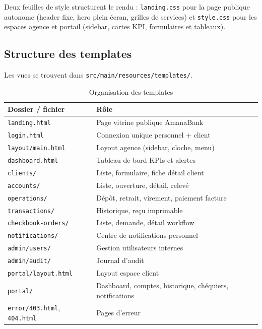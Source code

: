\documentclass[11pt,a4paper,oneside]{report}
\begin{document}
Deux feuilles de style structurent le rendu : \texttt{landing.css} pour la page publique autonome (header fixe, hero plein écran, grilles de services) et \texttt{style.css} pour les espaces agence et portail (sidebar, cartes KPI, formulaires et tableaux).

\subsection{Structure des templates}

Les vues se trouvent dans \texttt{src/main/resources/templates/}.

\begin{table}[H]
    \centering
    \caption{Organisation des templates}
    \label{tab:templates}
    \small
    \begin{tabular}{@{}lp{9cm}@{}}
        \rowcolor{AmanaBrown}
        \color{white}\textbf{Dossier / fichier} & \textbf{Rôle} \\
        \midrule
        \texttt{landing.html} & Page vitrine publique AmanaBank \\
        \texttt{login.html} & Connexion unique personnel + client \\
        \texttt{layout/main.html} & Layout agence (sidebar, cloche, menu) \\
        \texttt{dashboard.html} & Tableau de bord KPIs et alertes \\
        \texttt{clients/} & Liste, formulaire, fiche détail client \\
        \texttt{accounts/} & Liste, ouverture, détail, relevé \\
        \texttt{operations/} & Dépôt, retrait, virement, paiement facture \\
        \texttt{transactions/} & Historique, reçu imprimable \\
        \texttt{checkbook-orders/} & Liste, demande, détail workflow \\
        \texttt{notifications/} & Centre de notifications personnel \\
        \texttt{admin/users/} & Gestion utilisateurs internes \\
        \texttt{admin/audit/} & Journal d'audit \\
        \texttt{portal/layout.html} & Layout espace client \\
        \texttt{portal/} & Dashboard, comptes, historique, chéquiers, notifications \\
        \texttt{error/403.html}, \texttt{404.html} & Pages d'erreur \\
        \bottomrule
    \end{tabular}
\end{table}
\end{document}
